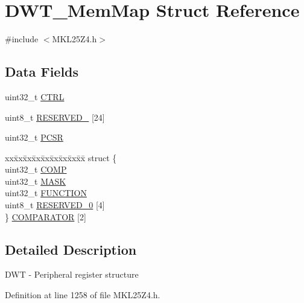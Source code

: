 \hypertarget{struct_d_w_t___mem_map}{}\section{D\+W\+T\+\_\+\+Mem\+Map Struct Reference}
\label{struct_d_w_t___mem_map}


{\ttfamily \#include $<$M\+K\+L25\+Z4.\+h$>$}

\subsection*{Data Fields}
\begin{DoxyCompactItemize}
\item 
uint32\+\_\+t \hyperlink{struct_d_w_t___mem_map_ab3581abb33e428126e7ec339e66514e4}{C\+T\+RL}
\item 
uint8\+\_\+t \hyperlink{struct_d_w_t___mem_map_a3c654f29dbc5f37bda4115869613ce2d}{R\+E\+S\+E\+R\+V\+E\+D\+\_} \mbox{[}24\mbox{]}
\item 
uint32\+\_\+t \hyperlink{struct_d_w_t___mem_map_a58d461cd26674ff3bce87778c4b54164}{P\+C\+SR}
\item 
\begin{tabbing}
xx\=xx\=xx\=xx\=xx\=xx\=xx\=xx\=xx\=\kill
struct \{\\
\>uint32\_t \hyperlink{struct_d_w_t___mem_map_ae10b19c1d610d27a71a1dc34a84a0e60}{COMP}\\
\>uint32\_t \hyperlink{struct_d_w_t___mem_map_a34e5e25a9ec81fc61eca09c6d6adadfa}{MASK}\\
\>uint32\_t \hyperlink{struct_d_w_t___mem_map_ad60c09cefe311e7809d9a57fad402f5c}{FUNCTION}\\
\>uint8\_t \hyperlink{struct_d_w_t___mem_map_a3c654f29dbc5f37bda4115869613ce2d}{RESERVED\_0} \mbox{[}4\mbox{]}\\
\} \hyperlink{struct_d_w_t___mem_map_a359fb3ddfe2614d916d5cbf1e90b04ea}{COMPARATOR} \mbox{[}2\mbox{]}\\

\end{tabbing}\end{DoxyCompactItemize}


\subsection{Detailed Description}
D\+WT -\/ Peripheral register structure 

Definition at line 1258 of file M\+K\+L25\+Z4.\+h.



